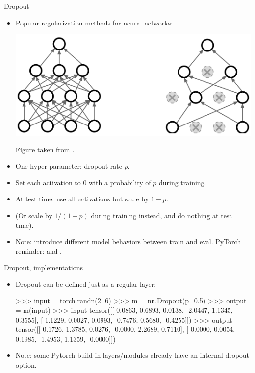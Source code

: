 \begin{frame}{Dropout}
\vspace{-5mm}
\begin{itemize}
\item Popular regularization methods for neural networks: .
  \begin{center}
    \includegraphics[height=0.4\textheight]{figures/dropout.png}
  \end{center}
\vspace{-3mm}
{\tiny Figure taken from \cite{stanford2019training}.}
\item One hyper-parameter: dropout rate $p$.
\item Set each activation to 0 with a probability of $p$ during training.
\item At test time: use all activations but scale by $1-p$.
\item (Or scale by $1/(1-p)$ during training instead, and do nothing at test time).
\item Note: introduce different model behaviors between train and eval. PyTorch reminder:  and .
\end{itemize}
\end{frame}

\begin{frame}[fragile]{Dropout, implementations}
\begin{itemize}
\item Dropout can be defined just as a regular layer:
\begin{python}
>>> input = torch.randn(2, 6)
>>> m = nn.Dropout(p=0.5)
>>> output = m(input)
>>> input
tensor([[-0.0863,  0.6893,  0.0138, -2.0447,  1.1345,  0.3555],
        [ 1.1229,  0.0027,  0.0993, -0.7476,  0.5680, -0.4255]])
>>> output
tensor([[-0.1726,  1.3785,  0.0276, -0.0000,  2.2689,  0.7110],
        [ 0.0000,  0.0054,  0.1985, -1.4953,  1.1359, -0.0000]])
\end{python}
\item Note: some Pytorch build-in layers/modules already have an internal dropout option.
\end{itemize}
\begin{python}
\end{python}
\end{frame}

